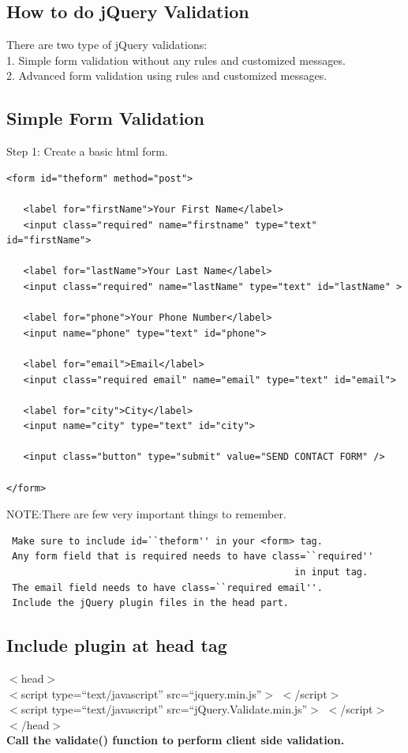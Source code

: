 \documentclass[11pt,a4paper]{article}
\begin{document}
\subsection*{How to do jQuery Validation}
There are two type of jQuery validations:\\
1. Simple form validation without any rules and customized messages.\\
2. Advanced form validation using rules and customized messages.\newline \newline \newline \newline
\subsection*{Simple Form Validation}
Step 1: Create a basic html form.
\begin{verbatim}
<form id="theform" method="post">

   <label for="firstName">Your First Name</label>
   <input class="required" name="firstname" type="text" id="firstName">

   <label for="lastName">Your Last Name</label>
   <input class="required" name="lastName" type="text" id="lastName" >

   <label for="phone">Your Phone Number</label>
   <input name="phone" type="text" id="phone">

   <label for="email">Email</label>
   <input class="required email" name="email" type="text" id="email">

   <label for="city">City</label>
   <input name="city" type="text" id="city">

   <input class="button" type="submit" value="SEND CONTACT FORM" />

</form> 
\end{verbatim}
NOTE:There are few very important things to remember.\\
\begin{lstlisting}
 Make sure to include id=``theform'' in your <form> tag.
 Any form field that is required needs to have class=``required''
                                                   in input tag.
 The email field needs to have class=``required email''. 
 Include the jQuery plugin files in the head part.
\end{lstlisting}
\subsection*{Include plugin at head tag}
$<$head$>$\\
$<$script type=``text/javascript'' src=``jquery.min.js''$>$ $<$/script$>$\\
$<$script type=``text/javascript'' src=``jQuery.Validate.min.js''$>$ $<$/script$>$\\
$<$/head$>$\\
\textbf{Call the validate() function to perform client side validation.}\newline \newline \newline \newline
\end{document}
